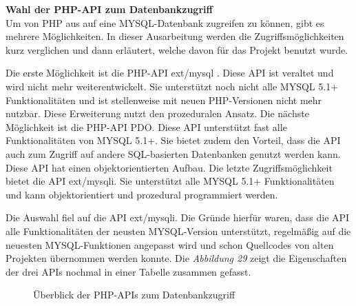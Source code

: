 \textbf{Wahl der PHP-API zum Datenbankzugriff}\\
Um von PHP aus auf eine MYSQL-Datenbank zugreifen zu können, gibt es mehrere Möglichkeiten. In dieser Ausarbeitung werden die Zugriffsmöglichkeiten kurz verglichen und dann erläutert, welche davon für das Projekt benutzt wurde.

Die erste Möglichkeit ist die PHP-API \glqq ext/mysql \grqq{}. Diese API ist veraltet und wird nicht mehr weiterentwickelt. Sie unterstützt noch nicht alle MYSQL 5.1+ Funktionalitäten und ist stellenweise mit neuen PHP-Versionen nicht mehr nutzbar. Diese Erweiterung nutzt den prozeduralen Ansatz. Die nächste Möglichkeit ist die PHP-API \glqq PDO\grqq{}. Diese API unterstützt fast alle Funktionalitäten von MYSQL 5.1+. Sie bietet zudem den Vorteil, dass die API auch zum Zugriff auf andere SQL-basierten Datenbanken genutzt werden kann. Diese API hat einen objektorientierten Aufbau.  Die letzte Zugriffsmöglichkeit bietet die API \glqq ext/mysqli\grqq{}. Sie unterstützt alle MYSQL 5.1+ Funktionalitäten und kann objektorientiert und prozedural programmiert werden.

Die Auswahl fiel auf die API \glqq ext/mysqli\grqq{}. Die Gründe hierfür waren, dass die API alle Funktionalitäten der neusten MYSQL-Version unterstützt, regelmäßig auf die neuesten MYSQL-Funktionen angepasst wird und schon Quellcodes von alten Projekten übernommen werden konnte. Die \textit{Abbildung 29} zeigt die Eigenschaften der drei APIs nochmal in einer Tabelle zusammen gefasst.
\begin{figure}[H]
	\begin{center}
	\end{center}
	\caption{Überblick der PHP-APIs zum Datenbankzugriff}
\end{figure}

